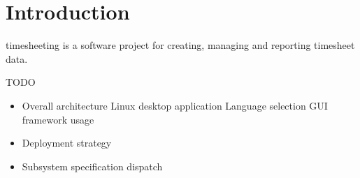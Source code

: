 \section{Introduction}
timesheeting is a software project for creating, managing and reporting
timesheet data.

TODO
\begin{itemize}
\item Overall architecture
  Linux desktop application
  Language selection
  GUI framework usage
\item Deployment strategy
\item Subsystem specification dispatch
\end{itemize}